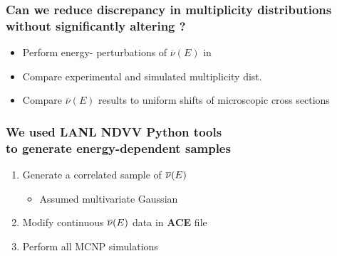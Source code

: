 \begin{frame}
\frametitle{Can we reduce discrepancy in multiplicity distributions \\ without significantly
altering \keff?}
{\addtolength\leftmargini{-0.2in}
 \addtolength\wideitemsep{0.1in}
\begin{itemize}
    \item[] Perform energy- perturbations of $\overline{\nu}(E)$  in
         \\ 
    \item[] Compare experimental and simulated multiplicity dist. 
            \\ 
        \item[] Compare $\overline{\nu}(E)$ results to uniform shifts of
		microscopic cross sections 
	\end{itemize}	
}
\end{frame} 











\begin{frame}
\frametitle{We used LANL NDVV Python tools \\ to generate energy-dependent \nubar  samples}
{\addtolength\wideitemsep{0.2in}
\begin{enumerate}
	\item Generate a correlated sample of $\overline{\nu}(E)$ 
        \begin{itemize}\vspace{0.1in}
            \item {Assumed multivariate
                    Gaussian \\ }
    \end{itemize}
  \item Modify continuous $\overline{\nu}(E)$ data in \textbf{ACE} file 
  \item Perform all MCNP simulations \\ 
\end{enumerate} 
}
\end{frame} 



